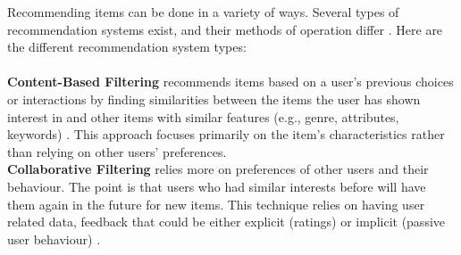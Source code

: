 \documentclass{llncs}
\begin{document}
Recommending items can be done in a variety of ways. Several types of recommendation systems exist, and their methods of operation differ \cite{Roy2022}. Here are the different recommendation system types:\\\\
%
%
\textbf{Content-Based Filtering} recommends items based on a user's previous choices or interactions by finding similarities between the items the user has shown interest in and other items with similar features (e.g., genre, attributes, keywords) \cite{pub.1034486657}.
This approach focuses primarily on the item's characteristics rather than relying on other users' preferences.\\
\textbf{Collaborative Filtering} relies more on preferences of other users and their behaviour. The point is that users who had similar interests before will have them again in the future for new items. This technique relies on having user related data, feedback that could be either explicit (ratings) or implicit (passive user behaviour) \cite{NILASHI2018507}.
%
\end{document}
